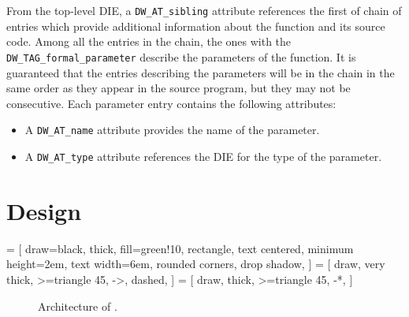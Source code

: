 From the top-level DIE, a \verb|DW_AT_sibling| attribute references the first
of chain of entries which provide additional information about the function
and its source code. Among all the entries in the chain, the ones with the
\verb|DW_TAG_formal_parameter| describe the parameters of the function. It is
guaranteed that the entries describing the parameters will be in the chain in
the same order as they appear in the source program, but they may not be
consecutive. Each parameter entry contains the following attributes:

\begin{itemize}
  \item A \verb|DW_AT_name| attribute provides the name of the parameter.
  \item A \verb|DW_AT_type| attribute references the DIE for the type of
    the parameter.
\end{itemize}



\section{Design}


 = [
  draw=black,
  thick,
  fill=green!10,
  rectangle,
  text centered,
  minimum height=2em,
  text width=6em,
  rounded corners,
  drop shadow,
]
 = [
  draw,
  very thick,
  >=triangle 45,
  ->,
  dashed,
]
 = [
  draw,
  thick,
  >=triangle 45,
  -*,
]

\begin{figure}
  \centering
  \caption{Architecture of \Eris*.}
  \label{fig:eris-architecture}
\end{figure}
